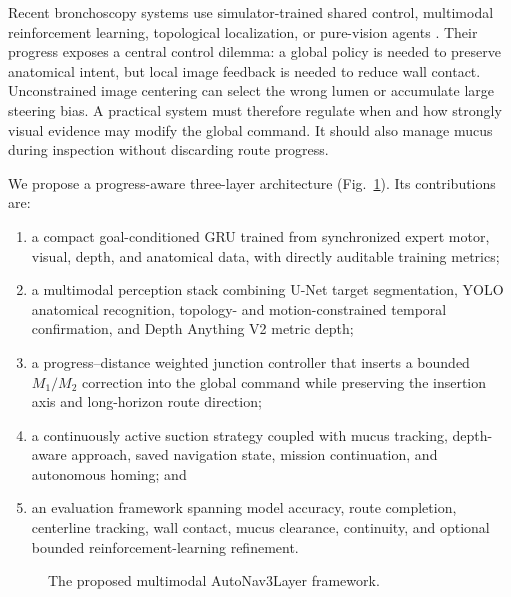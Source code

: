 \documentclass[letterpaper,10pt,conference]{ieeeconf}
\begin{document}
Recent bronchoscopy systems use simulator-trained shared control, multimodal
reinforcement learning, topological localization, or pure-vision agents
\cite{zhang2024aicopilot,zhao2024bronchocopilot,cold2026bronchobot,
wu2026longshort,tomasini2025topological}. Their progress exposes a central
control dilemma: a global policy is needed to preserve anatomical intent, but
local image feedback is needed to reduce wall contact. Unconstrained image
centering can select the wrong lumen or accumulate large steering bias. A
practical system must therefore regulate when and how strongly visual evidence
may modify the global command. It should also manage mucus during inspection
without discarding route progress.

We propose a progress-aware three-layer architecture (Fig.~\ref{fig:overview}).
Its contributions are:

\begin{enumerate}
  \item a compact goal-conditioned GRU trained from synchronized expert motor,
  visual, depth, and anatomical data, with directly auditable training metrics;
  \item a multimodal perception stack combining U-Net target segmentation,
  YOLO anatomical recognition, topology- and motion-constrained temporal
  confirmation, and Depth Anything V2 metric depth;
  \item a progress--distance weighted junction controller that inserts a
  bounded $M_1/M_2$ correction into the global command while preserving the
  insertion axis and long-horizon route direction;
  \item a continuously active suction strategy coupled with mucus tracking,
  depth-aware approach, saved navigation state, mission continuation, and
  autonomous homing; and
  \item an evaluation framework spanning model accuracy, route completion,
  centerline tracking, wall contact, mucus clearance, continuity, and optional
  bounded reinforcement-learning refinement.
\end{enumerate}

\begin{figure}[t]
\centering
{}
\caption{The proposed multimodal AutoNav3Layer framework.}
\label{fig:overview}
\end{figure}
\end{document}
